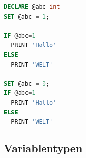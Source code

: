 \documentclass[12pt,ngerman,a4paper,index=totoc,twoside]{scrartcl}
\newcommand{\lwidth}{0.75}
\begin{document}
\begin{center}
\begin{minipage}{\lwidth\textwidth}
\begin{lstlisting}[language={SQL},caption={Beispiel für benutzerdefinierte Variablen},label={variablen:ex3}]
DECLARE @abc int
SET @abc = 1;

IF @abc=1
  PRINT 'Hallo'
ELSE
  PRINT 'WELT'

SET @abc = 0;
IF @abc=1
  PRINT 'Hallo'
ELSE
  PRINT 'WELT'
\end{lstlisting}
\end{minipage}
\end{center}



\subsection{Variablentypen}
\end{document}
